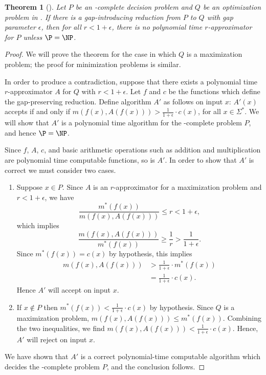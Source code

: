 \documentclass[]{article}
\theoremstyle{plain}
\newtheorem{theorem}{Theorem}
\theoremstyle{definition}
\begin{document}
\begin{theorem}[{\cite[Theorem~3.7]{book}}]\label{thm:gap}
  Let $P$ be an \NP-complete decision problem and $Q$ be an optimization problem in \NPO.
  If there is a gap-introducing reduction from $P$ to $Q$ with gap parameter $\epsilon$, then for all $r < 1 + \epsilon$, there is no polynomial time $r$-approximator for $P$ unless $\P = \NP$.
\end{theorem}
\begin{proof}
  We will prove the theorem for the case in which $Q$ is a maximization problem; the proof for minimization problems is similar.

  In order to produce a contradiction, suppose that there exists a polynomial time $r$-approximator $A$ for $Q$ with $r < 1 + \epsilon$.
  Let $f$ and $c$ be the functions which define the gap-preserving reduction.
  Define algorithm $A'$ as follows on input $x$: $A'(x)$ accepts if and only if $m(f(x), A(f(x))) > \frac{1}{1 + \epsilon} \cdot c(x)$, for all $x\in\Sigma^*$.
  We will show that $A'$ is a polynomial time algorithm for the \NP-complete problem $P$, and hence $\P=\NP$.

  Since $f$, $A$, $c$, and basic arithmetic operations such as addition and multiplication are polynomial time computable functions, so is $A'$.
  In order to show that $A'$ is correct we must consider two cases.
  \begin{enumerate}
  \item
    Suppose $x \in P$.
    Since $A$ is an $r$-approximator for a maximization problem and $r < 1 + \epsilon$, we have
    \begin{displaymath}
      \frac{m^*(f(x))}{m(f(x), A(f(x)))} \leq r < 1 + \epsilon,
    \end{displaymath}
    which implies
    \begin{displaymath}
      \frac{m(f(x), A(f(x)))}{m^*(f(x))} \geq \frac{1}{r} > \frac{1}{1 + \epsilon}.
    \end{displaymath}
    Since $m^*(f(x)) = c(x)$ by hypothesis, this implies
    \begin{align*}
      m(f(x), A(f(x))) & > \frac{1}{1 + \epsilon} \cdot m^*(f(x)) \\
      & = \frac{1}{1 + \epsilon} \cdot c(x).
    \end{align*}
    Hence $A'$ will accept on input $x$.
  \item
    If $x \notin P$ then $m^*(f(x)) < \frac{1}{1 + \epsilon} \cdot c(x)$ by hypothesis.
    Since $Q$ is a maximization problem, $m(f(x), A(f(x))) \leq m^*(f(x))$.
    Combining the two inequalities, we find $m(f(x), A(f(x))) < \frac{1}{1 + \epsilon} \cdot c(x)$.
    Hence, $A'$ will reject on input $x$.
  \end{enumerate}
  We have shown that $A'$ is a correct polynomial-time computable algorithm which decides the \NP-complete problem $P$, and the conclusion follows.
\end{proof}
\end{document}
